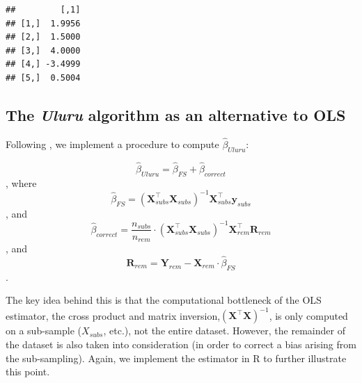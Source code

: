 \documentclass[
  12pt,
]{style/krantz}
\begin{document}
\begin{verbatim}
##         [,1]
## [1,]  1.9956
## [2,]  1.5000
## [3,]  4.0000
## [4,] -3.4999
## [5,]  0.5004
\end{verbatim}

\hypertarget{the-uluru-algorithm-as-an-alternative-to-ols}{%
\subsection{\texorpdfstring{The \emph{Uluru} algorithm as an alternative to OLS}{The Uluru algorithm as an alternative to OLS}}\label{the-uluru-algorithm-as-an-alternative-to-ols}}

Following \citet{dhillon_2013}, we implement a procedure to compute \(\hat{\beta}_{Uluru}\):

\[\hat{\beta}_{Uluru}=\hat{\beta}_{FS} + \hat{\beta}_{correct}\], where
\[\hat{\beta}_{FS} = (\mathbf{X}_{subs}^\intercal\mathbf{X}_{subs})^{-1}\mathbf{X}_{subs}^{\intercal}\mathbf{y}_{subs}\], and
\[\hat{\beta}_{correct}= \frac{n_{subs}}{n_{rem}} \cdot (\mathbf{X}_{subs}^\intercal\mathbf{X}_{subs})^{-1} \mathbf{X}_{rem}^{\intercal}\mathbf{R}_{rem}\], and
\[\mathbf{R}_{rem} = \mathbf{Y}_{rem} - \mathbf{X}_{rem}  \cdot \hat{\beta}_{FS}\].

The key idea behind this is that the computational bottleneck of the OLS estimator, the cross product and matrix inversion,\((\mathbf{X}^\intercal\mathbf{X})^{-1}\), is only computed on a sub-sample (\(X_{subs}\), etc.), not the entire dataset. However, the remainder of the dataset is also taken into consideration (in order to correct a bias arising from the sub-sampling). Again, we implement the estimator in R to further illustrate this point.
\end{document}

